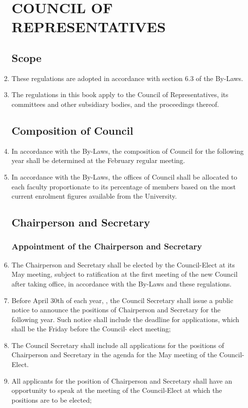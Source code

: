 \documentclass[oneside]{book}
\begin{document}
\begin{enumerate}
\part{\label{COUNCIL_OF_REPRESENTATIVES}COUNCIL OF REPRESENTATIVES}


\chapter{\label{Council_Scope}Scope }


\item These regulations are adopted in accordance with section 6.3 of the
By-Laws. 
\item The regulations in this book apply to the Council of Representatives,
its committees and other subsidiary bodies, and the proceedings thereof. 

\chapter{\label{Composition_of_Council}Composition of Council }
\item In accordance with the By-Laws, the composition of Council for the
following year shall be determined at the February regular meeting. 
\item In accordance with the By-Laws, the offices of Council shall be allocated
to each faculty proportionate to its percentage of members based on
the most current enrolment figures available from the University. 

\chapter{\label{Chairperson_and_Secretary}Chairperson and Secretary }


\section{\label{Appointment_of_the_Chairperson_and_Secretary}Appointment
of the Chairperson and Secretary }
\item The Chairperson and Secretary shall be elected by the Council-Elect
at its May meeting, subject to ratification at the first meeting of
the new Council after taking office, in accordance with the By-Laws
and these regulations. 
\item Before April 30th of each year, , the Council Secretary shall issue
a public notice to announce the positions of Chairperson and Secretary
for the following year. Such notice shall include the deadline for
applications, which shall be the Friday before the Council- elect
meeting; 
\item The Council Secretary shall include all applications for the positions
of Chairperson and Secretary in the agenda for the May meeting of
the Council-Elect. 
\item All applicants for the position of Chairperson and Secretary shall
have an opportunity to speak at the meeting of the Council-Elect at
which the positions are to be elected; 


\end{enumerate}
\end{document}
